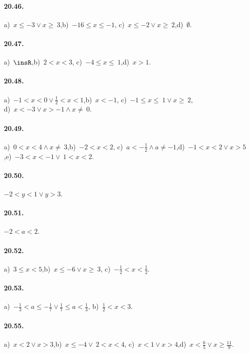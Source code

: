 \paragraph{20.46.} a)~$x\le -3\vee x\ge~3$,\quad b)~$-16\le x\le -1$,\quad
c)~$x\le -2\vee x\ge~2$,\quad d)~$\emptyset $.

\paragraph{20.47.} a)~$\insR$,\quad b)~$2<x<3$,\quad
c)~$-4\le x\le~1$,\quad d)~$x>1$.

\paragraph{20.48.} a)~$-1<x<0\vee \frac{1}{2}<x<1$,\quad b)~$x<-1$,\quad
c)~$-1\le x\le~1\vee x\ge~2$,\quad \protect\\ d)~$x<-3\vee x>-1\wedge x\neq~0$.

\paragraph{20.49.} a)~$0<x<4\wedge x\neq~3$,\quad b)~$-2<x<2$,\quad
c)~$a<-{\frac{1}{2}}\wedge a\neq -1$,\quad d)~$-1<x<2\vee x>5$,\quad e)~$-3<x<-1\vee~1<x<2$.

\paragraph{20.50.} $-2<y<1\vee y>3$.

\paragraph{20.51.} $-2<a<2$.

\paragraph{20.52.} a)~$3\le x<5$,\quad b)~$x\le -6\vee x\ge~3$,\quad
c)~$-{\frac{1}{2}}<x<\frac{1}{2}$.

\paragraph{20.53.} a)~$-{\frac{1}{3}}<a\le -{\frac{1}{7}}\vee \frac{1}{7}\le a<\frac{1}{3}$,\quad
b)~$\frac{1}{2}<x<3$.

\paragraph{20.55.} a)~$x<2\vee x>3$,\quad b)~$x\le -4\vee~2<x<4$,\quad
c)~$x<1\vee x>4$,\quad d)~$x<\frac{6}{5}\vee x\ge\frac{11}{9}$.

